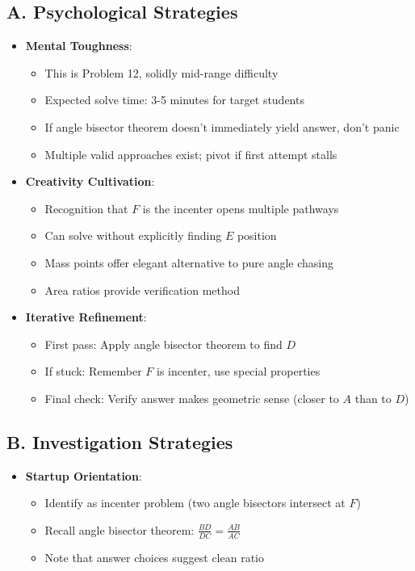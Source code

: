 \documentclass[12pt]{article}
\begin{document}
\begin{strategicbox}
\subsection*{A. Psychological Strategies}
\begin{itemize}[leftmargin=*]
    \item \textbf{Mental Toughness}: 
    \begin{itemize}
        \item This is Problem 12, solidly mid-range difficulty
        \item Expected solve time: 3-5 minutes for target students
        \item If angle bisector theorem doesn't immediately yield answer, don't panic
        \item Multiple valid approaches exist; pivot if first attempt stalls
    \end{itemize}
    
    \item \textbf{Creativity Cultivation}: 
    \begin{itemize}
        \item Recognition that $F$ is the incenter opens multiple pathways
        \item Can solve without explicitly finding $E$ position
        \item Mass points offer elegant alternative to pure angle chasing
        \item Area ratios provide verification method
    \end{itemize}
    
    \item \textbf{Iterative Refinement}: 
    \begin{itemize}
        \item First pass: Apply angle bisector theorem to find $D$
        \item If stuck: Remember $F$ is incenter, use special properties
        \item Final check: Verify answer makes geometric sense (closer to $A$ than to $D$)
    \end{itemize}
\end{itemize}

\subsection*{B. Investigation Strategies}
\begin{itemize}[leftmargin=*]
    \item \textbf{Startup Orientation}: 
    \begin{itemize}
        \item Identify as incenter problem (two angle bisectors intersect at $F$)
        \item Recall angle bisector theorem: $\frac{BD}{DC} = \frac{AB}{AC}$
        \item Note that answer choices suggest clean ratio
    \end{itemize}
    

\end{itemize}
\end{strategicbox}
\end{document}
